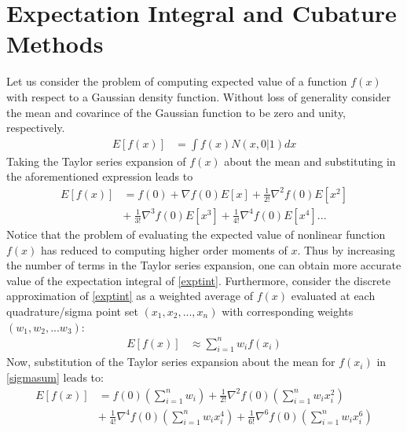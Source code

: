 \documentclass[letterpaper, 10 pt, conference]{IEEEtran}  %
\begin{document}
\section{Expectation Integral and Cubature Methods}
Let us consider the problem of computing expected value of a function $f(x)$ with respect to a Gaussian density function. Without loss of generality consider the mean and covarince of the Gaussian function to be zero and unity, respectively. %
\begin{align}
E[f(x)]&= \int{f(x)N(x,0|1)}dx \label{exptint}
\end{align}
Taking the Taylor series expansion of $f(x)$ about the mean and substituting in the aforementioned expression leads to
\begin{align}
E[f(x)]&= f(0)+\nabla{f(0)}E[{x}]+\frac{1}{2!}\nabla^2f(0)E[{x}^2]\nonumber \\ 
&{+}\: \frac{1}{3!}\nabla^3f(0)E[{x}^3]+\frac{1}{4!}\nabla^4f(0)E[{x}^4]... \label{exptinttaylor}
\end{align}
Notice that the problem of evaluating the expected value of nonlinear function $f(x)$ has reduced to computing higher order moments of $x$. Thus by increasing the number of terms in the Taylor series expansion, one can obtain more accurate value of the expectation integral of \eqref{exptint}. Furthermore, consider the discrete approximation of \eqref{exptint} as a weighted average of  $f(x)$ evaluated at each quadrature/sigma point set $(x_1,x_2,...,x_n)$ with corresponding weights $(w_1,w_2,...w_3)$:
\begin{align}
E[f(x)]&{}\approx\sum_{i=1}^n{w_if(x_i)}\label{sigmasum}
\end{align}
Now, substitution of the Taylor series expansion about the mean for $f(x_i)$ in \eqref{sigmasum} leads to: %
\begin{align}
E[f(x)]&{}={} f(0)(\sum_{i=1}^n{w_i})+\frac{1}{2!}\nabla^2f(0)(\sum_{i=1}^n{w_ix_i^2})\nonumber\\
&{+}\: \frac{1}{4!}\nabla^4f(0)(\sum_{i=1}^n{w_ix_i^4})+\frac{1}{6!}\nabla^6f(0)(\sum_{i=1}^n{w_ix_i^6}) \label{compeqnssigtotay}
\end{align}
\end{document}

